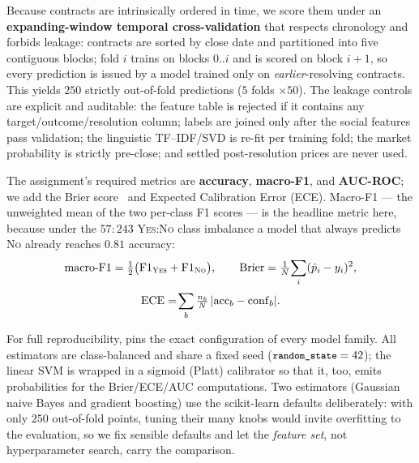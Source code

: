 \noindent Because contracts are intrinsically ordered in time, we score them under an
\textbf{expanding-window temporal cross-validation} that respects chronology and forbids
leakage: contracts are sorted by close date and partitioned into five contiguous blocks;
fold $i$ trains on blocks $0..i$ and is scored on block $i{+}1$, so every prediction is
issued by a model trained only on \emph{earlier}-resolving contracts. This yields $250$
strictly out-of-fold predictions ($5$ folds $\times 50$). The leakage controls are
explicit and auditable: the feature table is rejected if it contains any
target/outcome/resolution column; labels are joined only after the social features pass
validation; the linguistic TF--IDF/SVD is re-fit per training fold; the market
probability is strictly pre-close; and settled post-resolution prices are never used.

\noindent The assignment's required metrics are \textbf{accuracy}, \textbf{macro-F1}, and
\textbf{AUC-ROC}; we add the Brier score~\cite{brier1950verification} and Expected
Calibration Error (ECE). Macro-F1 --- the unweighted mean of the two per-class F1 scores
--- is the headline metric here, because under the $57{:}243$ \textsc{Yes}{:}\textsc{No}
class imbalance a model that always predicts \textsc{No} already reaches $0.81$ accuracy:
\begin{gather}
\text{macro-F1}=\tfrac{1}{2}\big(\mathrm{F1}_{\textsc{Yes}}+\mathrm{F1}_{\textsc{No}}\big),
\qquad
\text{Brier}=\tfrac{1}{N}\!\sum_i (\hat p_i-y_i)^2,\\[2pt]
\text{ECE}=\!\sum_b \tfrac{n_b}{N}\,|\mathrm{acc}_b-\mathrm{conf}_b|.
\end{gather}

\noindent For full reproducibility,  pins the exact configuration of
every model family. All estimators are class-balanced and share a fixed seed
($\texttt{\small random\_state}=42$); the linear SVM is wrapped in a sigmoid (Platt) calibrator so
that it, too, emits probabilities for the Brier/ECE/AUC computations. Two estimators
(Gaussian naive Bayes and gradient boosting) use the scikit-learn defaults deliberately:
with only $250$ out-of-fold points, tuning their many knobs would invite overfitting to
the evaluation, so we fix sensible defaults and let the \emph{feature set}, not
hyperparameter search, carry the comparison.

